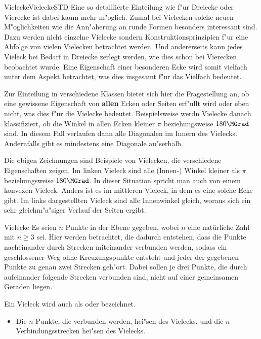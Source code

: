 \begin{MXContent}{Vielecke}{Vielecke}{STD}
Eine so detaillierte Einteilung wie f"ur Dreiecke oder Vierecke ist dabei
kaum mehr m"oglich. Zumal bei Vielecken solche neuen M"oglichkeiten wie die 
Ann"aherung an runde Formen besonders interessant sind. Dazu werden nicht 
einzelne Vielecke sondern Konstruktionsprinzipien f"ur eine Abfolge von vielen
Vielecken betrachtet werden. Und andererseits kann jedes Vieleck bei Bedarf 
in Dreiecke zerlegt werden, wie dies schon bei Vierecken beobachtet wurde.
Eine Eigenschaft einer besonderen Ecke wird somit vielfach unter dem Aspekt 
betrachtet, was dies insgesamt f"ur das Vielfach bedeutet.

Zur Einteilung in verschiedene Klassen bietet sich hier die Fragestellung an,
ob eine gewissene Eigenschaft von \textbf{allen} Ecken oder Seiten erf"ullt
wird oder eben nicht, was dies f"ur die Vielecke bedeutet.
Beispielsweise werdn Vielecke danach klassifiziert, ob die Winkel in allen
Ecken kleiner $\pi$ beziehungsweise $180\MGrad$ sind. In diesem Fall verlaufen
dann alle Diagonalen im Innern des Vielecks. Andernfalls gibt es mindestens 
eine Diagonale au"serhalb.

Die obigen Zeichnungen sind Beispiele von Vielecken, die verschiedene
Eigenschaften zeigen. Im linken Vieleck sind alle (Innen-) Winkel kleiner 
als $\pi$ beziehungsweise $180\MGrad$. In dieser Situation spricht man auch 
von einem konvexen Vieleck. Anders ist es im mittleren Vieleck, in dem es eine
solche Ecke gibt. 
Im links dargestellten Vieleck sind alle Innenwinkel gleich, woraus sich ein 
sehr gleichm"a"siger Verlauf der Seiten ergibt.

\begin{MXInfo}{Vielecke}%
Es seien $n$ Punkte in der Ebene gegeben, wobei $n$ eine nat\"urliche Zahl mit 
$n \geq 3$ sei.
Hier werden  betrachtet, die dadurch entstehen, dass
die Punkte nacheinander durch Strecken miteinander verbunden werden, sodass 
ein geschlossener Weg ohne Kreuzungspunkte entsteht und jeder der gegebenen 
Punkte zu genau zwei Strecken geh"ort. 
Dabei sollen je drei Punkte, die durch aufeinander folgende Strecken verbunden
sind, nicht auf einer gemeinsamen Geraden liegen.

Ein Vieleck wird auch als  oder 
 bezeichnet.

\begin{itemize}
\item Die $n$ Punkte, die verbunden werden, hei"sen 
  des Vielecks, und
 die $n$ Verbindungsstrecken hei"sen
  des Vielecks.


\end{itemize}
\end{MXInfo}
\end{MXContent}

